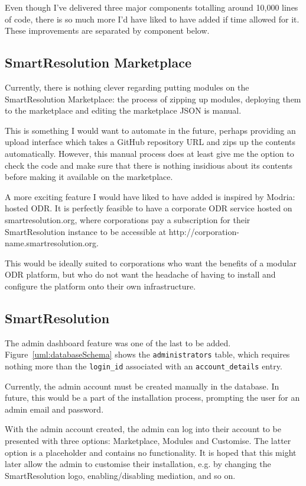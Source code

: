 Even though I've delivered three major components totalling around 10,000 lines of code, there is so much more I'd have liked to have added if time allowed for it. These improvements are separated by component below.

\subsection{SmartResolution Marketplace}

Currently, there is nothing clever regarding putting modules on the SmartResolution Marketplace: the process of zipping up modules, deploying them to the marketplace and editing the marketplace JSON is manual.

This is something I would want to automate in the future, perhaps providing an upload interface which takes a GitHub repository URL and zips up the contents automatically. However, this manual process does at least give me the option to check the code and make sure that there is nothing insidious about its contents before making it available on the marketplace.

A more exciting feature I would have liked to have added is inspired by Modria: hosted ODR. It is perfectly feasible to have a corporate ODR service hosted on smartresolution.org, where corporations pay a subscription for their SmartResolution instance to be accessible at http://corporation-name.smartresolution.org.

This would be ideally suited to corporations who want the benefits of a modular ODR platform, but who do not want the headache of having to install and configure the platform onto their own infrastructure.

\subsection{SmartResolution}

The admin dashboard feature was one of the last to be added. Figure~\ref{uml:databaseSchema} shows the \lstinline{administrators} table, which requires nothing more than the \lstinline{login_id} associated with an \lstinline{account_details} entry.

Currently, the admin account must be created manually in the database. In future, this would be a part of the installation process, prompting the user for an admin email and password.

With the admin account created, the admin can log into their account to be presented with three options: Marketplace, Modules and Customise. The latter option is a placeholder and contains no functionality. It is hoped that this might later allow the admin to customise their installation, e.g. by changing the SmartResolution logo, enabling/disabling mediation, and so on.

